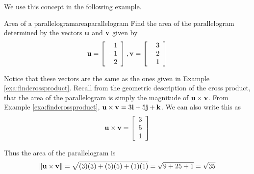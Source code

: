 \begin{center}
\end{center}

We use this concept in the following example.

\begin{example}{Area of a parallelogram}{areaparallelogram}
Find the area of the
 parallelogram determined by the vectors ${\bf u}$
and ${\bf v}$ given by 
\begin{equation*}
{\bf u}
=
\left[
\begin{array}{r}
1 \\
-1 \\
2
\end{array}
\right], 
{\bf v}
=
\left[
\begin{array}{r}
3 \\
-2 \\
1
\end{array}
\right]
\end{equation*}
\end{example}

\begin{solution}
Notice that these vectors are the same as the ones given in Example \ref{exa:findcrossproduct}.
Recall from the geometric description of the cross
product, that the area of the parallelogram is simply the magnitude of ${\bf u} \times {\bf v}$. 
From Example \ref{exa:findcrossproduct}, ${\bf u} \times {\bf v} = 3{\bf i}+5{\bf j}+{\bf k}$.
We can also write this as
\begin{equation*}
{\bf u} \times {\bf v}
=
\left[
\begin{array}{r}
3 \\
5 \\
1
\end{array}
\right]
\end{equation*}

Thus the area of the parallelogram is 
\begin{equation*}
\| {\bf u} \times {\bf v} \| = 
\sqrt{(3)(3) + (5)(5) + (1)(1)} = 
\sqrt{9+25+1}=\sqrt{35}
\end{equation*}
\end{solution}

